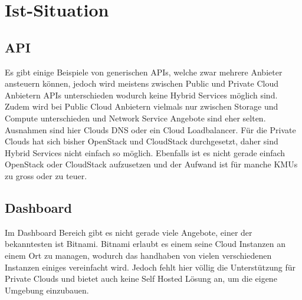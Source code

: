 \section{Ist-Situation}
\subsection{API}
Es gibt einige Beispiele von generischen APIs, welche zwar mehrere Anbieter 
ansteuern können, jedoch wird meistens zwischen Public und Private Cloud Anbietern APIs 
unterschieden wodurch keine Hybrid Services möglich sind.
Zudem wird bei Public Cloud Anbietern vielmals nur zwischen Storage und 
Compute unterschieden und Network Service Angebote sind eher selten.
Ausnahmen sind hier Clouds DNS oder ein Cloud Loadbalancer.
Für die Private Clouds hat sich bisher OpenStack und CloudStack durchgesetzt, 
daher sind Hybrid Services nicht einfach so möglich.
Ebenfalls ist es nicht gerade einfach OpenStack oder CloudStack
 aufzusetzen und der Aufwand ist für manche KMUs zu gross oder zu teuer.



\subsection{Dashboard}

Im Dashboard Bereich gibt es nicht gerade viele Angebote, einer der bekanntesten ist Bitnami.
Bitnami erlaubt es einem seine Cloud Instanzen an einem Ort zu managen, wodurch 
das handhaben von vielen verschiedenen Instanzen einiges vereinfacht wird.
Jedoch fehlt hier völlig die Unterstützung für Private Clouds und bietet auch keine Self Hosted Lösung an, 
um die eigene Umgebung einzubauen.